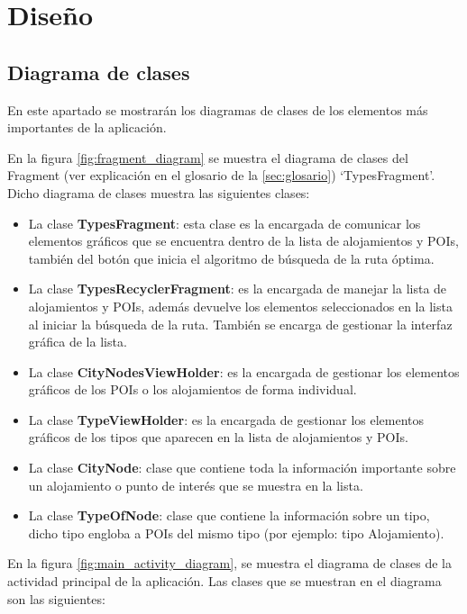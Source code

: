 \section{Diseño}
\subsection[Diagrama de clases]{Diagrama de clases}
En este apartado se mostrarán los diagramas de clases de los elementos más importantes de la aplicación.\newline

En la figura \ref{fig:fragment_diagram} se muestra el diagrama de clases del Fragment (ver explicación en el glosario de la \autoref{sec:glosario}) \enquote*{TypesFragment}. Dicho diagrama de clases muestra las siguientes clases:
\begin{itemize}
	\item La clase \textbf{TypesFragment}: esta clase es la encargada de comunicar los elementos gráficos que se encuentra dentro de la lista de alojamientos y POIs, también del botón que inicia el algoritmo de búsqueda de la ruta óptima.
	\item La clase \textbf{TypesRecyclerFragment}: es la encargada de manejar la lista de alojamientos y POIs, además devuelve los elementos seleccionados en la lista al iniciar la búsqueda de la ruta. También se encarga de gestionar la interfaz gráfica de la lista.
	\item La clase \textbf{CityNodesViewHolder}: es la encargada de gestionar los elementos gráficos de los POIs o los alojamientos de forma individual.
	\item La clase \textbf{TypeViewHolder}: es la encargada de gestionar los elementos gráficos de los tipos que aparecen en la lista de alojamientos y POIs.
	\item La clase \textbf{CityNode}: clase que contiene toda la información importante sobre un alojamiento o punto de interés que se muestra en la lista.
	\item La clase \textbf{TypeOfNode}: clase que contiene la información sobre un tipo, dicho tipo engloba a POIs del mismo tipo (por ejemplo: tipo Alojamiento).
\end{itemize}
\vspace{0.06in}
En la figura  \ref{fig:main_activity_diagram}, se muestra el diagrama de clases de la actividad principal de la aplicación. Las clases que se muestran en el diagrama son las siguientes:
